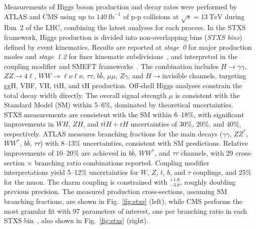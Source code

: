 \documentclass[a4paper,11pt]{article}
\begin{document}
Measurements of Higgs boson production and decay rates were performed
by ATLAS and CMS using up to $140~\text{fb}^{-1}$ of p-p collisions
at $\sqrt{s} = 13~\text{TeV}$ during Run~2 of the LHC, combining the
latest analyses for each process.
%
In the STXS framework, Higgs production is divided into non-overlapping
bins (\emph{STXS bins}) defined by event kinematics. Results are
reported at \textit{stage~0} for major production modes and
\textit{stage~1.2} for finer kinematic subdivisions~\cite{stxs}, and
interpreted in the coupling modifier and \textsc{SMEFT} frameworks~\cite{smeft}.
%
The combination includes $H \to \gamma\gamma$, $ZZ \to 4\ell$, $WW \to
\ell\nu\ell\nu$, $\tau\tau$, $b\bar{b}$, $\mu\mu$, $Z\gamma$, and $H
\to \text{invisible}$ channels, targeting ggH, VBF, VH, ttH, and tH
production.  Off-shell Higgs analyses constrain the total decay width
directly.
%
The overall signal strength $\mu$ is consistent with the Standard
Model (SM) within 5–6\%, dominated by theoretical uncertainties. STXS
measurements are consistent with the SM within 6–18\%, with
significant improvements in $WH$, $ZH$, and $t\bar{t}H+tH$
uncertainties of 30\%, 20\%, and 40\%, respectively.
%
ATLAS measures branching fractions for the main decays ($\gamma\gamma$,
$ZZ^*$, $WW^*$, $b\bar{b}$, $\tau\tau$) with 8–13\% uncertainties,
consistent with SM predictions. Relative improvements of 10–20\% are
achieved in $b\bar{b}$, $WW^*$, and $\tau\tau$ channels, with 29
cross-section $\times$ branching ratio combinations reported.
%
Coupling modifier interpretations yield 5–12\% uncertainties for $W$,
$Z$, $t$, $b$, and $\tau$ couplings, and 25\% for the muon. The charm
coupling is constrained with $^{+1.6}_{-3.8}$, roughly doubling
previous precision.
%
The measured production cross-sections, assuming SM branching
fractions, are shown in Fig.~\ref{fig:stxs} (left), while CMS
performs the most granular fit with 97 parameters of interest, one per
branching ratio in each STXS bin~\cite{cms-comb}, also shown in
Fig.~\ref{fig:stxs} (right).
%
\end{document}
